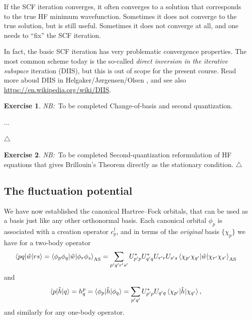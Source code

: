 \documentclass{report}
\theoremstyle{plain}
\theoremstyle{definition}
\newtheorem{exerc}{Exercise}[chapter]
\newcommand\xqed[1]{%
  \leavevmode\unskip\penalty9999 \hbox{}\nobreak\hfill
  \quad\hbox{#1}}
\newcommand\demo{\xqed{$\triangle$}}
\newenvironment{exercise}{\bigskip\begin{exerc}}{\demo\end{exerc}\bigskip}
\newcommand{\note}[1]{{\color{red}\emph{NB:}~#1}}
\begin{document}
If the SCF iteration converges, it often converges to a solution that
corresponds to the true HF minimum wavefunction. Sometimes it does not
converge to the true solution, but is still useful. Sometimes it does not
converge at all, and one needs to ``fix'' the SCF iteration. 

In fact, the basic SCF iteration has very problematic convergence
properties.  The most common scheme today is the so-called
\emph{direct inversion in the iterative subspace} iteration (DIIS),
but this is out of scope for the present course. Read more aboud DIIS
in Helgaker/J{\o}rgensen/Olsen \cite{HJO}, and see also \url{https://en.wikipedia.org/wiki/DIIS}.


\begin{exercise} \note{To be completed}
  Change-of-basis and second quantization.

  ...

\end{exercise}

\begin{exercise} \note{To be completed}
  Second-quantization reformulation of HF equations that gives
  Brillouin's Theorem directly as the stationary condition.
\end{exercise}

\subsection{The fluctuation potential}

We have now established the canonical Hartree--Fock orbitals, that can
be used as a basis just like any other orthonormal basis. Each
canonical orbital $\phi_p$ is associated with a creation operator
$c_p^\dag$, and in terms of the \emph{original} basis $\{\chi_p\}$ we
have for a two-body operator
\begin{equation}
  \braket{pq|\hat{w}|rs} = \braket{\phi_p \phi_q|\hat{w}|\phi_r \phi_s}_\text{AS} = \sum_{p'q'r's'} U^*_{p'p} U^*_{q'q} U_{r'r}
  U_{s's}
  \braket{\chi_{p'}\chi_{q'}|\hat{w}|\chi_{r'}\chi_{s'}}_\text{AS} \label{eq:antisymm-elems-hf-inter}
\end{equation}
and
\begin{equation}
 \braket{p|\hat{h}|q} = h^p_q = \braket{\phi_p|\hat{h}|\phi_q} = \sum_{p'q'} U_{p'p}^*
  U_{q'q} \braket{\chi_{p'}|\hat{h}|\chi_{q'}},
\end{equation}
and similarly for any one-body operator.
\end{document}
